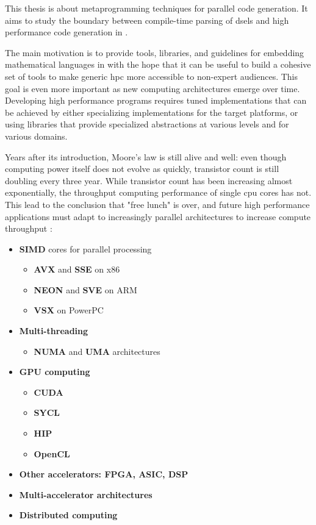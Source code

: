 \documentclass[main]{subfiles}
\begin{document}
This thesis is about metaprogramming techniques for parallel code generation.
It aims to study the boundary between compile-time parsing of
\glspl{dsel} and high performance code generation in \cpp.

The main motivation is to provide tools, libraries, and guidelines for embedding
mathematical languages in \cpp with the hope that it can be useful to build a
cohesive set of tools to make generic \gls{hpc} more accessible
to non-expert audiences. This goal is even more important as new computing
architectures emerge over time. Developing high performance programs requires
tuned implementations that can be achieved by either specializing
implementations for the target platforms, or using libraries that provide
specialized abstractions at various levels and for various domains.

Years after its introduction, Moore's law is still alive and well:
even though computing power itself does not evolve as quickly,
transistor count is still doubling every three year.
While transistor count has been increasing almost exponentially,
the throughput computing performance of single \gls{cpu} cores has not.
This lead to the conclusion that "free lunch" is over, and future
high performance applications must adapt to increasingly parallel architectures
to increase compute throughput
\cite{concurrency-revolution, doi:10.1142/S0129626404001829}:

\begin{itemize}
\item \textbf{SIMD} cores for parallel processing

\begin{itemize}
\item \textbf{AVX} and \textbf{SSE} on x86
\item \textbf{NEON} and \textbf{SVE} on ARM
\item \textbf{VSX} on PowerPC
\end{itemize}

\item \textbf{Multi-threading}

\begin{itemize}
\item \textbf{NUMA} and \textbf{UMA} architectures
\end{itemize}

\item \textbf{GPU computing}

\begin{itemize}
\item \textbf{CUDA}
\item \textbf{SYCL}
\item \textbf{HIP}
\item \textbf{OpenCL}
\end{itemize}

\item \textbf{Other accelerators: FPGA, ASIC, DSP}
\item \textbf{Multi-accelerator architectures}
\item \textbf{Distributed computing}
\end{itemize}
\end{document}
